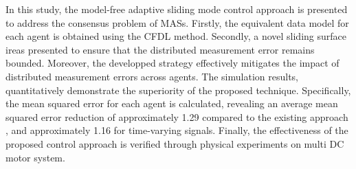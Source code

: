 \documentclass[journal,onecolumn]{IEEEtran}
\begin{document}
In this study, the model-free adaptive sliding mode control approach is presented to address the consensus problem of MASs. Firstly, the equivalent data model for each agent is obtained using the CFDL method. Secondly, a novel sliding surface ireas presented to ensure that the distributed measurement error remains bounded. Moreover, the developped strategy effectively mitigates the impact of distributed measurement errors across agents. The simulation results, quantitatively demonstrate the superiority of the proposed technique. Specifically, the mean squared error for each agent is calculated, revealing an average mean squared error reduction of approximately 1.29 compared to the existing approach \cite{1}, and approximately 1.16 for time-varying signals. Finally, the effectiveness of the proposed control approach is verified through physical experiments on multi DC motor system.








\end{document}
